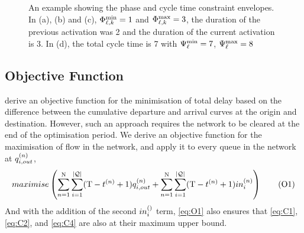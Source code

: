 \begin{figure*}[t!]
\centering
\caption{An example showing the phase and cycle time constraint envelopes. In (a), (b) and (c), $\PTMIN{\ell}{k}=1$ and $\PTMAX{\ell}{k}=3$, the duration of the previous activation was 2 and the duration of the current activation is 3. In (d), the total cycle time is 7 with $\CTMIN{\ell}=7$, $\CTMAX{\ell}=8$}
\label{fig:phase_plots}
\end{figure*}

\subsection{Objective Function}
 derive an objective function for the minimisation of total delay based on the difference between the cumulative departure and arrival curves at the origin and destination. However, such an approach requires the network to be cleared at the end of the optimisation period. We derive an objective function for the maximisation of flow in the network, and apply it to every queue in the network at $\qout{i}$,
\begin{equation}
maximise \left( \sum\limits_{n=1}^{\Nn} \sum\limits_{i=1}^{\Qn} (\TMAX - \tn + 1) \qout{i} + \sum\limits_{n=1}^{\Nn} \sum\limits_{i=1}^{\Qn} (\TMAX - \tn + 1) \inq{i} \right) 
\tag{O1}\label{eq:O1}
\end{equation}
And with the addition of the second $\inq[]{i}$ term, \ref{eq:O1} also ensures that \ref{eq:C1}, \ref{eq:C2}, and \ref{eq:C4} are also at their maximum upper bound.


